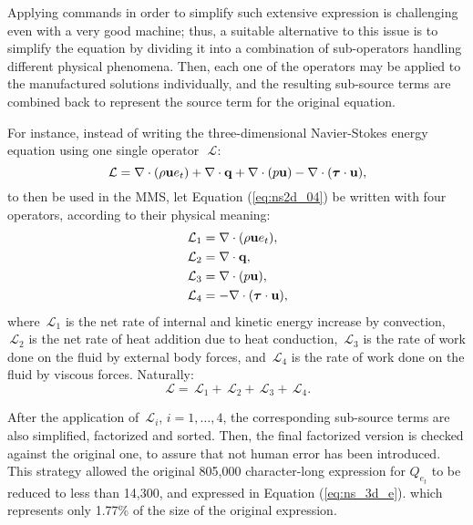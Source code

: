 \documentclass[10pt]{article}
\newcommand{\Diff}[2] {\dfrac{\partial( #1)}{\partial #2}}
\newcommand{\bv}[1]{\ensuremath{\mbox{\boldmath$ #1 $}}}
\newcommand{\Lo}{\,\mathcal{L}}
\begin{document}
Applying commands in order to simplify such extensive expression is challenging even with a very good machine; thus, a suitable alternative to this issue is to simplify the equation by dividing it into a combination of sub-operators handling different physical phenomena. Then, each one of the operators may be applied to the manufactured solutions individually, and the resulting sub-source terms are combined back to represent the source term for the original equation.



For instance, instead of writing the three-dimensional Navier-Stokes energy equation using one single operator~$\Lo$:
\begin{equation}
 \label{eq:ns2d_04}
\Lo= \nabla \cdot (\rho\mathbf{u}e_t) +\nabla\cdot \mathbf{q} +  \nabla\cdot(p  \mathbf{u})  - \nabla \cdot (\bv{\tau} \cdot \mathbf{u}),
\end{equation}
to then be used in the MMS, let Equation (\ref{eq:ns2d_04}) be written with four operators, according to their physical meaning:
\begin{equation}
 \begin{split}
  \Lo_1&=\nabla \cdot (\rho\mathbf{u}e_t),\\
  \Lo_2&=\nabla\cdot \mathbf{q},\\
  \Lo_3&= \nabla\cdot(p  \mathbf{u}),\\
  \Lo_4&=- \nabla \cdot (\bv{\tau} \cdot \mathbf{u}),
 \end{split}
\end{equation}
where  $\Lo_1$ is the net rate of internal and kinetic energy increase by convection, $\Lo_2$ is the net rate of heat addition due to heat conduction, $\Lo_3$ is the rate of work done on the fluid by external body forces, and $\Lo_4$ is the rate of work done on the fluid by viscous forces. Naturally:
$$\Lo=\Lo_1+\Lo_2+\Lo_3+\Lo_4.$$

 After the application of $\Lo_i$, $i=1,\dots,4$, the corresponding sub-source terms are also simplified, factorized and sorted. Then, the final factorized version is checked against the original one, to assure that not human error has been introduced.  This strategy allowed the original  805,000 character-long  expression for $Q_{e_t}$ to be reduced to less than 14,300, and expressed in Equation (\ref{eq:ns_3d_e}). which represents only 1.77\% of the size of the original expression.
\end{document}
